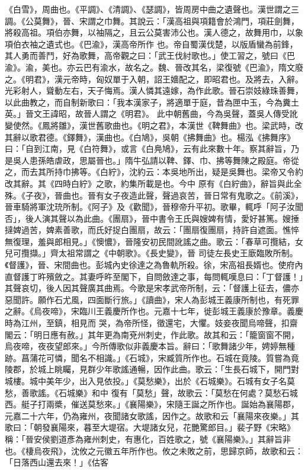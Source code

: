 \begin{pinyinscope}
 《白雪》，周曲也。《平調》、《清調》、《瑟調》，皆周房中曲之遺聲也。漢世謂之三調。《公莫舞》，晉、宋謂之巾舞。其說云：「漢高祖與項籍會於鴻門，項莊劍舞，將殺高祖。項伯亦舞，以袖隔之，且云公莫害沛公也。漢人德之，故舞用巾，以象項伯衣袖之遺式也。《巴渝》，漢高帝所作
 也。帝自蜀漢伐楚，以版盾蠻為前鋒，其人勇而善鬥，好為歌舞，高帝觀之曰：「武王伐紂歌也。」使工習之，號曰《巴渝》。渝，美也。亦云巴有渝水，故名之。魏、晉改其名，梁復號《巴渝》，隋文廢之。《明君》，漢元帝時，匈奴單于入朝，詔王嬙配之，即昭君也。及將去，入辭。光彩射人，聳動左右，天子悔焉。漢人憐其遠嫁，為作此歌。晉石崇妓綠珠善舞，以此曲教之，而自制新歌曰：「我本漢家子，將適單于庭，昔為匣中玉，今為糞土英。」晉文王諱昭，故晉人謂之《明君》。
 此中朝舊曲，今為吳聲，蓋吳人傳受訛變使然。《鳳將雛》，漢世舊歌曲也。《明之君》，本漢世《鞞舞曲》也。梁武時，改其辭以歌君德。《鐸舞》，漢曲也。《白鳩》，吳朝《拂舞曲》也。楊泓《拂舞序》曰：「自到江南，見《白符舞》，或言《白鳧鳩》，云有此來數十年。察其辭旨，乃是吳人患孫皓虐政，思屬晉也。」隋牛弘請以鞞、鐸、巾、拂等舞陳之殿庭。帝從之，而去其所持巾拂等。《白紵》，沈約云：本吳地所出，疑是吳舞也。梁帝又令約改其辭。其《四時白紵》之歌，約集所載是也。今中
 原有《白紵曲》，辭旨與此全殊。《子夜》，晉曲也。晉有女子夜造此聲，聲過哀苦，晉日常有鬼歌之。《前溪》，晉車騎將軍沈珫所制。《阿子》及《歡聞》，晉穆帝升平初。歌畢，輒呼「阿子汝聞否」，後人演其聲以為此曲。《團扇》，晉中書令王氏與嫂婢有情，愛好甚篤。嫂捶撻婢過苦，婢素善歌，而氏好捉白團扇，故云：「團扇復團扇，持許自遮面。憔悴無復理，羞與郎相見。」《懊憹》，晉隆安初民間訛謠之曲。歌云：「春草可攬結，女兒可攬擷。」齊太祖常謂之《中朝歌》。《長史變》，晉
 司徒左長史王廞臨敗所制。《督護》，晉、宋間曲也。彭城內史徐達之為魯軌所殺。徐，宋高祖長婿也。使府內直督護丁旿殯斂之。其妻呼旿至閣下，自問斂達之事，每問輒嘆息曰：「丁督護！」其聲哀切，後人因其聲廣其曲焉。今歌是宋孝武帝所制，云：「督護上征去，儂亦惡聞許。願作石尤風，四面斷行旅。」《讀曲》，宋人為彭城王義康所制也，有死罪之辭。《烏夜啼》，宋臨川王義慶所作也。元嘉十七年，徙彭城王義康於豫章。義慶時為江州，至鎮，相見而
 哭，為帝所怪，徵還宅，大懼。妓妾夜聞烏啼聲，扣齋閣云：「明日應有赦。」其年更為南兗州刺史，作此歌。故其和云：「籠窗窗不開，烏夜啼，夜夜望郎來。」今所傳歌似非義慶本旨。辭曰：「歌舞諸少年，娉婷無種跡。菖蒲花可憐，聞名不相識。」《石城》，宋臧質所作也。石城在竟陵。質嘗為竟陵郡，於城上眺矚，見群少年歌謠通暢，因作此曲。歌云：「生長石城下，開門對城樓。城中美年少，出入見依投。」《莫愁樂》，出於《石城樂》。石城有女子名莫愁，善歌謠。《石城樂》和中
 復有「莫愁」聲，故歌云：「莫愁在何處？莫愁石城西。艇子打兩槳，催送莫愁來。」《襄陽樂》，宋隨王誕之所作也。誕始為襄陽郡，元嘉二十六年，仍為雍州，夜聞諸女歌謠，因作之。故歌和云「襄陽來夜樂。」其歌曰：「朝發襄陽來，暮至大堤宿。大堤諸女兒，花艷驚郎目。」裴子野《宋略》稱：「晉安侯劉道彥為雍州刺史，有惠化，百姓歌之，號《襄陽樂》。」其辭旨非也。《棲烏夜飛》，沈攸之元徽五年所作也。攸之未敗之前，思歸京師，故歌和云：「日落西山還去來！」《估客

\end{pinyinscope}
